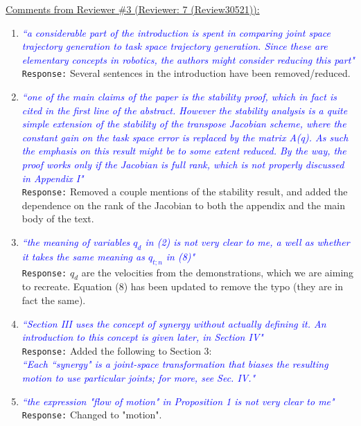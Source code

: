 \documentclass{article}
\begin{document}
\underline{Comments from Reviewer \#3 (Reviewer: 7 (Review30521)):}
\begin{enumerate}
\item \textcolor{blue}{\textit{``a considerable part of the introduction is spent in comparing joint space trajectory generation to task
space trajectory generation. Since these are elementary concepts in robotics, the authors might consider
reducing this part"}} \texttt{Response:} Several sentences in the introduction have been removed/reduced.\\

\item \textcolor{blue}{\textit{``one of the main claims of the paper is the stability proof, which in fact is cited in the first line of the
abstract. However the stability analysis is a quite simple extension of the stability of the transpose
Jacobian scheme, where the constant gain on the task space error is replaced by the matrix A(q). As
such the emphasis on this result might be to some extent reduced. By the way, the proof works only
if the Jacobian is full rank, which is not properly discussed in Appendix I"}}\\
\texttt{Response:}  Removed a couple mentions of the stability result, and added the dependence on the rank of the Jacobian to both the appendix and the main body of the text.\\

\item \textcolor{blue}{\textit{``the meaning of variables $q_d$ in (2) is not very clear to me, a well as whether it takes the same meaning
as $q_{t;n}$ in (8)"}}\\
\texttt{Response:} $q_d$ are the velocities from the demonstrations, which we are aiming to recreate. Equation (8) has been updated to remove the typo (they are in fact the same).\\

\item \textcolor{blue}{\textit{``Section III uses the concept of synergy without actually defining it. An introduction to this concept is given later, in Section IV"}}\\
\texttt{Response:} Added the following to Section 3:\\
\textcolor{blue}{\small \textit{``Each ``synergy" is a joint-space transformation that biases the resulting motion to use particular joints; for more, see Sec. IV."}}\\

\item \textcolor{blue}{\textit{``the expression "flow of motion" in Proposition 1 is not very clear to me"}}\\
\texttt{Response:}  Changed to "motion".\\


\end{enumerate}
\end{document}
